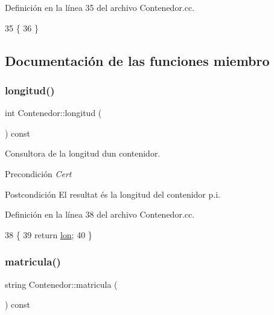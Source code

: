 Definición en la línea 35 del archivo Contenedor.\+cc.


\begin{DoxyCode}
35                         \{
36 \}
\end{DoxyCode}


\subsection{Documentación de las funciones miembro}
\mbox{\label{class_contenedor_a203894805dd0b8347f9884990dab0d9d}} 
\subsubsection{\texorpdfstring{longitud()}{longitud()}}
{\footnotesize\ttfamily int Contenedor\+::longitud (\begin{DoxyParamCaption}{ }\end{DoxyParamCaption}) const}



Consultora de la longitud d\textquotesingle{}un contenidor. 

\begin{DoxyPrecond}{Precondición}
{\itshape Cert} 
\end{DoxyPrecond}
\begin{DoxyPostcond}{Postcondición}
El resultat és la longitud del contenidor p.\+i. 
\end{DoxyPostcond}


Definición en la línea 38 del archivo Contenedor.\+cc.


\begin{DoxyCode}
38                                \{
39   \textcolor{keywordflow}{return} \hyperlink{class_contenedor_a364e04e5a1c7787463981f192f48e4ce}{lon};
40 \}
\end{DoxyCode}
\mbox{\label{class_contenedor_aac5839c94f8d3be8a908740a1af0b716}} 
\subsubsection{\texorpdfstring{matricula()}{matricula()}}
{\footnotesize\ttfamily string Contenedor\+::matricula (\begin{DoxyParamCaption}{ }\end{DoxyParamCaption}) const}




